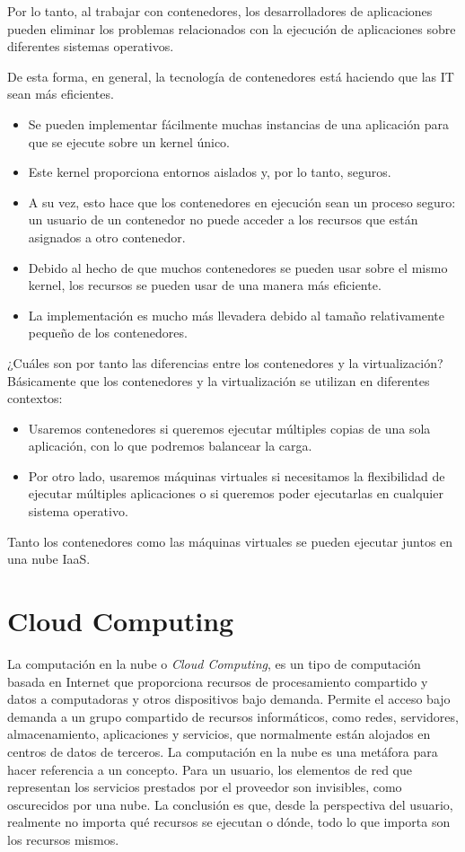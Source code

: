 Por lo tanto, al trabajar con contenedores, los desarrolladores de aplicaciones pueden eliminar los problemas relacionados con la ejecución de aplicaciones sobre diferentes sistemas operativos.

De esta forma, en general, la tecnología de contenedores está haciendo que las IT sean más eficientes.

\begin{itemize}
\item Se pueden implementar fácilmente muchas instancias de una aplicación para que se ejecute sobre un kernel único.
\item Este kernel proporciona entornos aislados y, por lo tanto, seguros.
\item A su vez, esto hace que los contenedores en ejecución sean un proceso seguro: un usuario de un contenedor no puede acceder a los recursos que están asignados a otro contenedor. 
\item Debido al hecho de que muchos contenedores se pueden usar sobre el mismo kernel, los recursos se pueden usar de una manera más eficiente. 
\item La implementación es mucho más llevadera debido al tamaño relativamente pequeño de los contenedores.
\end{itemize}

¿Cuáles son por tanto las diferencias entre los contenedores y la virtualización? Básicamente que los contenedores y la virtualización se utilizan en diferentes contextos:

\begin{itemize}
\item Usaremos contenedores si queremos ejecutar múltiples copias de una sola aplicación, con lo que podremos balancear la carga. 
\item Por otro lado, usaremos máquinas virtuales si necesitamos la flexibilidad de ejecutar múltiples aplicaciones o si queremos poder ejecutarlas en cualquier sistema operativo.
\end{itemize}

Tanto los contenedores como las máquinas virtuales se pueden ejecutar juntos en una nube IaaS.

\section{Cloud Computing}
La computación en la nube o \textit{Cloud Computing}, es un tipo de computación basada en Internet que proporciona recursos de procesamiento compartido y datos a computadoras y otros dispositivos bajo demanda. Permite el acceso bajo demanda a un grupo compartido de recursos informáticos, como redes, servidores, almacenamiento, aplicaciones y servicios, que normalmente están alojados en centros de datos de terceros. La computación en la nube es una metáfora para hacer referencia a un concepto. Para un usuario, los elementos de red que representan los servicios prestados por el proveedor son invisibles, como oscurecidos por una nube. La conclusión es que, desde la perspectiva del usuario, realmente no importa qué recursos se ejecutan o dónde, todo lo que importa son los recursos mismos.

